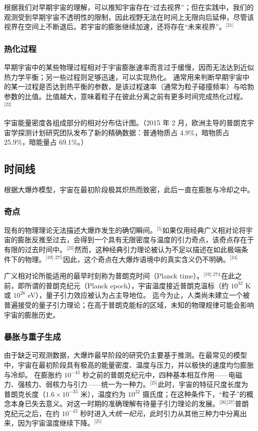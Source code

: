根据我们对早期宇宙的理解，可以推知宇宙存在“过去视界”；但在实践中，我们的观测受到早期宇宙不透明性的限制，因此视野无法在时间上无限向后延伸，尽管该视界在空间上不断退后。若宇宙的膨胀继续加速，还将存在“未来视界”。\(^\text{[21]}\)
\subsubsection{热化过程}
早期宇宙中的某些物理过程相对于宇宙膨胀速率而言过于缓慢，因而无法达到近似热力学平衡；另一些过程则足够迅速，可以实现热化。  
通常用来判断早期宇宙中的某一过程是否达到热平衡的参数，是该过程速率（通常为粒子碰撞频率）与哈勃参数的比值。比值越大，意味着粒子在彼此分离之前有更多时间完成热化过程。\(^\text{[22]}\)

宇宙能量密度各组成部分的相对分布估计图。（2015 年 2 月，欧洲主导的普朗克宇宙学探测计划研究团队发布了新的精确数据：普通物质占 4.9\%，暗物质占 25.9\%，暗能量占 69.1\%。）
\subsection{时间线}
根据大爆炸模型，宇宙在最初阶段极其炽热而致密，此后一直在膨胀与冷却之中。
\subsubsection{奇点}
现有的物理理论无法描述大爆炸发生的确切瞬间。\(^\text{[5]}\)如果仅用经典广义相对论将宇宙的膨胀反推至过去，会得到一个具有无限密度与温度的引力奇点，该奇点存在于有限的过去时间中。\(^\text{[23]}\)然而，这种经典引力理论被认为不足以描述在如此极端条件下的物理。\(^\text{[19]: 275}\) 因此，这个奇点在大爆炸语境中的真实含义仍不明确。\(^\text{[24]}\)

广义相对论所能适用的最早时刻称为普朗克时间（Planck time）。\(^\text{[19]: 274}\) 在此之前，即所谓的普朗克纪元（Planck epoch），宇宙温度接近普朗克温标（约 $10^{32}$ K 或 $10^{28}$ eV），量子引力效应被认为占主导地位。  
迄今为止，人类尚未建立一个被普遍接受的量子引力理论；在高于普朗克能标的区域，未知的物理规律可能会影响宇宙的膨胀历史。
\subsubsection{暴胀与重子生成}
由于缺乏可观测数据，大爆炸最早阶段的研究仍主要基于推测。在最常见的模型中，宇宙在最初阶段具有极高的能量密度、温度与压力，并以极快的速度均匀膨胀与冷却。  
在膨胀约 $10^{-43}$ 秒之前的普朗克纪元中，四种基本相互作用——电磁力、强核力、弱核力与引力——统一为一种力。\(^\text{[25]}\)此时，宇宙的特征尺度长度为普朗克长度（$1.6\times10^{-35}$ 米），温度约为 $10^{32}$ 摄氏度；在这种条件下，“粒子”的概念本身已失去意义。对这一时期的准确理解有待量子引力理论的发展。\(^\text{[26][27]}\)普朗克纪元之后，在约 $10^{-43}$ 秒时进入\emph{大统一纪元}，此时引力从其他三种力中分离出来，因为宇宙温度继续下降。\(^\text{[25]}\)

